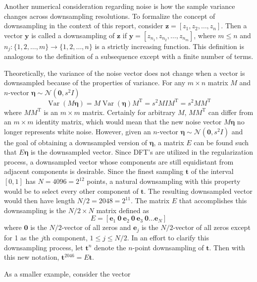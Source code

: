 \documentclass[12pt]{article}
\newcommand{\tdis}{\mathbf{t}}
\newcommand{\trans}{\mathrm{T}}	%
\newcommand{\SD}{s}	%
\newcommand{\noise}{\bm{\eta}}	%
\newcommand{\Var}{\operatorname{Var}}	%
\begin{document}
Another numerical consideration regarding noise is how the sample variance changes across downsampling resolutions. To formalize the concept of downsampling in the context of this report, consider $\mathbf{z} = [z_1,z_2,\ldots,z_n]$. Then a vector $\mathbf{y}$ is called a downsampling of $\mathbf{z}$ if $\mathbf{y} = [z_{n_1},z_{n_2},\ldots,z_{n_m}]$, where $m \leq n$ and $n_j:\{1,2,\ldots,m\}\rightarrow\{1,2,\ldots,n\}$ is a strictly increasing function. This definition is analogous to the definition of a subsequence except with a finite number of terms. \par
Theoretically, the variance of the noise vector does not change when a vector is downsampled because of the properties of variance. For any $m\times n$ matrix $M$ and $n$-vector $\noise \sim \mathcal{N}(\bm{0},\SD^2I)$
\begin{equation}
\Var(M\noise) = M\Var(\noise)M^{\trans} = \SD^2MIM^{\trans} = \SD^2MM^{\trans}
\label{Eq_VarProp}
\end{equation}
where $MM^\trans$ is an $m \times m$ matrix. Certainly for arbitrary $M$, $MM^\trans$ can differ from an $m \times m$ identity matrix, which would mean that the new noise vector $M\noise$ no longer represents white noise. However, given an $n$-vector $\noise \sim \mathcal{N}(\bm{0},\SD^2I)$ and the goal of obtaining a downsampled version of $\noise$, a matrix $E$ can be found such that $E\noise$ is the downsampled vector. Since DFT's are utilized in the regularization process, a downsampled vector whose components are still equidistant from adjacent components is desirable. Since the finest sampling $\tdis$ of the interval $[0,1]$ has $N = 4096 = 2^{12}$ points, a natural downsampling with this property would be to select every other component of $\tdis$. The resulting downsampled vector would then have length $N/2 = 2048 = 2^{11}$. The matrix $E$ that accomplishes this downsampling is the $N/2 \times N$ matrix defined as
\begin{equation}
E = [\mathbf{e}_1 \: \mathbf{0} \: \mathbf{e}_2 \: \mathbf{0} \: \mathbf{e}_3 \: \mathbf{0} \ldots \mathbf{e}_N]
\label{Eq_E}
\end{equation}
where $\mathbf{0}$ is the $N/2$-vector of all zeros and $\mathbf{e}_j$ is the $N/2$-vector of all zeros except for 1 as the $j\text{th}$ component, $1 \leq j \leq N/2$. In an effort to clarify this downsampling process, let $\tdis^{n}$ denote the $n$-point downsampling of $\tdis$. Then with this new notation, $\tdis^{2046} = E\tdis$. \par
As a smaller example, consider the vector
\end{document}
